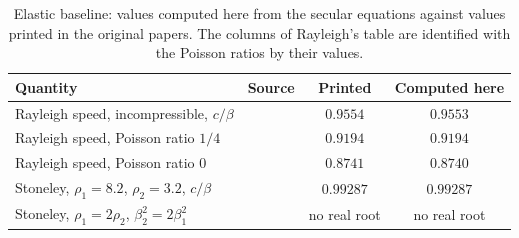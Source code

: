 \begin{table}[ht]\centering\small
\caption{Elastic baseline: values computed here from the secular equations against values printed in the original papers. The columns of Rayleigh's table are identified with the Poisson ratios by their values.}\label{tab:layered}
\begin{tabular}{@{}llcc@{}}\toprule
Quantity & Source & Printed & Computed here\\\midrule
Rayleigh speed, incompressible, $c/\beta$ & \citet{Rayleigh1885} & $0.9554$ & $0.9553$\\
Rayleigh speed, Poisson ratio $1/4$ & \citet{Rayleigh1885} & $0.9194$ & $0.9194$\\
Rayleigh speed, Poisson ratio $0$ & \citet{Rayleigh1885} & $0.8741$ & $0.8740$\\
Stoneley, $\rho_1=8.2$, $\rho_2=3.2$, $c/\beta$ & \citet{Stoneley1924} & $0.99287$ & $0.99287$\\
Stoneley, $\rho_1=2\rho_2$, $\beta_2^2=2\beta_1^2$ & \citet{Stoneley1924} & no real root & no real root\\\bottomrule
\end{tabular}
\end{table}
